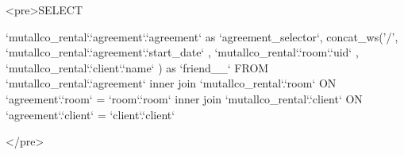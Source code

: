 <pre>SELECT 
	
	`mutallco_rental`.`agreement`.`agreement`  as `agreement_selector`,
	concat_ws('/', `mutallco_rental`.`agreement`.`start_date` , `mutallco_rental`.`room`.`uid` , `mutallco_rental`.`client`.`name` ) as `friend__` 
FROM 
	`mutallco_rental`.`agreement`
inner join 	 `mutallco_rental`.`room` ON  `agreement`.`room` = `room`.`room`
inner join 	 `mutallco_rental`.`client` ON  `agreement`.`client` = `client`.`client`

</pre>